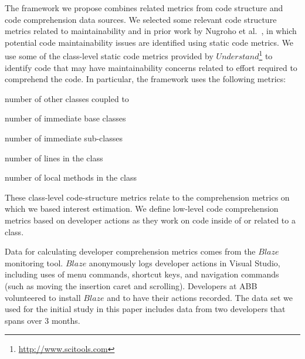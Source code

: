 
The framework we propose combines related metrics from code structure and code comprehension data sources.  We selected some relevant code structure metrics related to maintainability and \TD in prior work by Nugroho et al.~\cite{Nugroho_etal:2011}, in which potential code maintainability issues are identified using static code metrics.  We use some of the class-level static code metrics provided by $Understand$\footnote{\url{http://www.scitools.com}} to identify code that may have maintainability concerns related to effort required to comprehend the code. In particular, the framework uses the following metrics:
\begin{description}[font=\itshape\mdseries,style=nextline]
    \item[Count Class Coupled] number of other classes coupled to
    \item[Count Class Base] number of immediate base classes
    \item[Count Class Derived] number of immediate sub-classes
    \item[Count Line Code] number of lines in the class
    \item[Count Declared Method] number of local methods in the class
\end{description}

These class-level code-structure metrics relate to the comprehension metrics on which we based interest estimation. We define low-level code comprehension metrics based on developer actions as they work on code inside of or related to a class.

Data for calculating developer comprehension metrics comes from the $Blaze$~\cite{Snipes_etal:2014} monitoring tool.  $Blaze$ anonymously logs developer actions in Visual Studio, including uses of menu commands, shortcut keys, and navigation commands (such as moving the insertion caret and scrolling).  Developers at ABB volunteered to install $Blaze$ and to have their actions recorded.  The data set we used for the initial study in this paper includes data from two developers that spans over 3 months.

